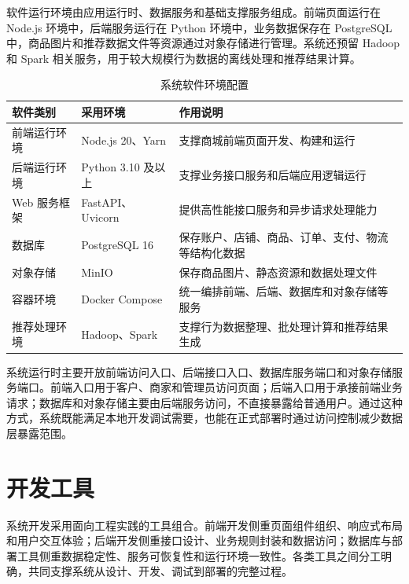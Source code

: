 ﻿\documentclass[oneside, UTF8]{ctexbook}
\begin{document}
软件运行环境由应用运行时、数据服务和基础支撑服务组成。前端页面运行在 Node.js 环境中，后端服务运行在 Python 环境中，业务数据保存在 PostgreSQL 中，商品图片和推荐数据文件等资源通过对象存储进行管理。系统还预留 Hadoop 和 Spark 相关服务，用于较大规模行为数据的离线处理和推荐结果计算。

\begin{table}[H]
  \centering
  \caption{系统软件环境配置}
  \label{tab:implementation_software_config}
  \small
  \renewcommand{\arraystretch}{1.22}
  \begin{tabular}{p{}p{}p{}}
    \toprule
    软件类别 & 采用环境 & 作用说明 \\
    \midrule
    前端运行环境 & Node.js 20、Yarn & 支撑商城前端页面开发、构建和运行 \\
    后端运行环境 & Python 3.10 及以上 & 支撑业务接口服务和后端应用逻辑运行 \\
    Web 服务框架 & FastAPI、Uvicorn & 提供高性能接口服务和异步请求处理能力 \\
    数据库 & PostgreSQL 16 & 保存账户、店铺、商品、订单、支付、物流等结构化数据 \\
    对象存储 & MinIO & 保存商品图片、静态资源和数据处理文件 \\
    容器环境 & Docker Compose & 统一编排前端、后端、数据库和对象存储等服务 \\
    推荐处理环境 & Hadoop、Spark & 支撑行为数据整理、批处理计算和推荐结果生成 \\
    \bottomrule
  \end{tabular}
\end{table}

系统运行时主要开放前端访问入口、后端接口入口、数据库服务端口和对象存储服务端口。前端入口用于客户、商家和管理员访问页面；后端入口用于承接前端业务请求；数据库和对象存储主要由后端服务访问，不直接暴露给普通用户。通过这种方式，系统既能满足本地开发调试需要，也能在正式部署时通过访问控制减少数据层暴露范围。

\section{开发工具}

系统开发采用面向工程实践的工具组合。前端开发侧重页面组件组织、响应式布局和用户交互体验；后端开发侧重接口设计、业务规则封装和数据访问；数据库与部署工具侧重数据稳定性、服务可恢复性和运行环境一致性。各类工具之间分工明确，共同支撑系统从设计、开发、调试到部署的完整过程。
\end{document}
